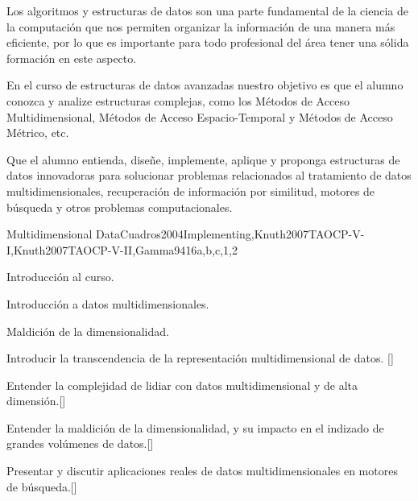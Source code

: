 \begin{syllabus}


\begin{justification}
Los algoritmos y estructuras de datos son una parte fundamental de la ciencia de la computación que nos 
permiten organizar la información de una manera más eficiente, por lo que es importante para todo 
profesional del área tener una sólida formación en este aspecto.

En el curso de estructuras de datos avanzadas nuestro objetivo es que el alumno conozca y analize 
estructuras complejas, como los Métodos de Acceso Multidimensional, 
Métodos de Acceso Espacio-Temporal y Métodos de Acceso Métrico, etc.
\end{justification}

\begin{goals}
\item Que el alumno entienda, diseñe, implemente, aplique y
proponga estructuras de datos innovadoras para solucionar
problemas relacionados al tratamiento de datos multidimensionales,
recuperación de información por similitud, motores de búsqueda y
otros problemas computacionales.
\end{goals}



\begin{unit}{Multidimensional Data}{}{Cuadros2004Implementing,Knuth2007TAOCP-V-I,Knuth2007TAOCP-V-II,Gamma94}{16}{a,b,c,1,2}
   \begin{topics}
         \item Introducción al curso.
         \item Introducción a datos multidimensionales. 
         \item Maldición de la dimensionalidad.
         
   \end{topics}
   \begin{learningoutcomes}
         \item Introducir la transcendencia de la representación multidimensional de datos. [\Usage]
         \item Entender la complejidad de lidiar con datos multidimensional y de alta dimensión.[\Usage]
         \item Entender la maldición de la dimensionalidad, y su impacto en el indizado de grandes volúmenes de datos.[\Usage]
         \item Presentar y discutir aplicaciones reales de datos multidimensionales en motores de búsqueda.[\Usage]
   \end{learningoutcomes}
\end{unit}


\end{syllabus}
